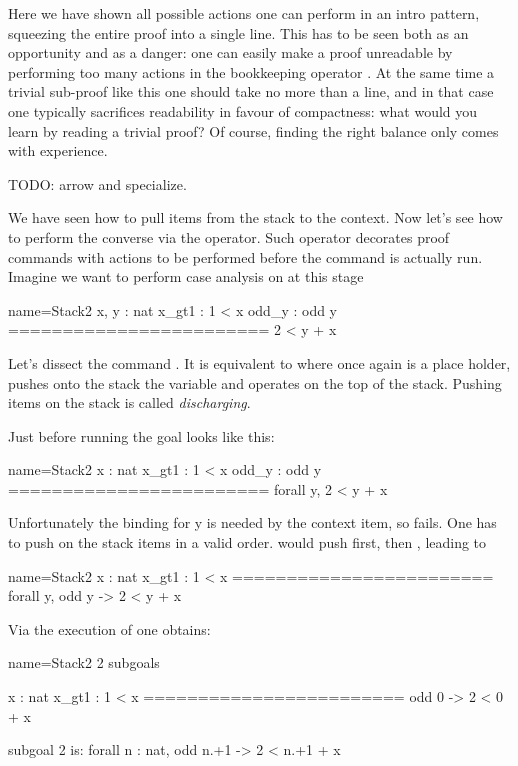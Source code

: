 Here we have shown all possible actions one can perform in an intro
pattern, squeezing the entire proof into a single line.  This has
to be seen both as an opportunity and as a danger: one can easily
make a proof unreadable by performing too many actions in the bookkeeping
operator \C{=>}.  At the same time a trivial sub-proof like this one
should take no more than a line, and in that case one typically
sacrifices readability in favour of compactness: what would you learn by
reading a trivial proof?  Of course,
finding the right balance only comes with experience.

TODO: arrow and specialize.

We have seen how to pull items from the stack to the context.  Now let's see
how to perform the converse via the \C{:} operator.  Such operator decorates
proof commands with actions to be performed before the command is actually run.
Imagine we want to perform case analysis on  at this stage

\begin{coqout}{name=Stack2}{}
 x, y : nat
 x_gt1 : 1 < x
 odd_y : odd y
 ========================
 2 < y + x
\end{coqout}

Let's dissect the command .  It is equivalent to
 where  once again is a place holder,
 pushes onto the stack the  variable and 
operates on the top of the stack.
Pushing items on the stack is called \emph{discharging}.

Just before running  the goal looks like this:

\begin{coqout}{name=Stack2}{}
 x : nat
 x_gt1 : 1 < x
 odd_y : odd y
 ========================
 forall y, 2 < y + x
\end{coqout}

Unfortunately the binding for y is needed by the 
context item, so  fails.  One has to push on the stack
items in a valid order.   would push 
first, then , leading to

\begin{coqout}{name=Stack2}{}
 x : nat
 x_gt1 : 1 < x
 ========================
 forall y, odd y -> 2 < y + x
\end{coqout}

Via the execution of  one obtains:

\begin{coqout}{name=Stack2}{}
2 subgoals
  
  x : nat
  x_gt1 : 1 < x
  ========================
   odd 0 -> 2 < 0 + x

subgoal 2 is:
 forall n : nat, odd n.+1 -> 2 < n.+1 + x
\end{coqout}

